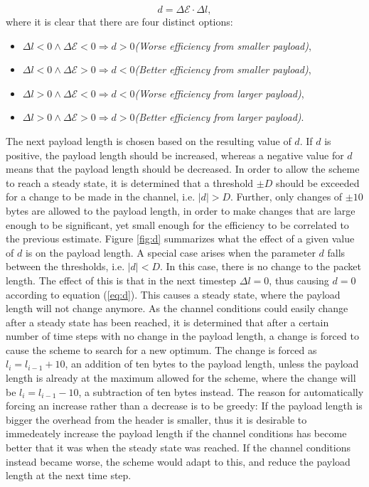 \begin{equation}
d = \Delta \mathcal{E}\cdot\Delta l,\label{eq:d}
\end{equation}
where it is clear that there are four distinct options:
\begin{itemize}  
\setlength{\itemsep}{1pt}
\setlength{\parskip}{0pt}
\setlength{\parsep}{0pt}
\item[ ] $\Delta l < 0 \wedge \Delta \mathcal{E} < 0 \Rightarrow d > 0$\quad \textit{(Worse efficiency from smaller payload)},
\item[ ] $\Delta l < 0 \wedge \Delta \mathcal{E} > 0 \Rightarrow d < 0$\quad \textit{(Better efficiency from smaller payload)},
\item[ ] $\Delta l > 0 \wedge \Delta \mathcal{E} < 0 \Rightarrow d < 0$\quad \textit{(Worse efficiency from larger payload)},
\item[ ] $\Delta l > 0 \wedge \Delta \mathcal{E} > 0 \Rightarrow d > 0$\quad \textit{(Better efficiency from larger payload)}.
\end{itemize}
The next payload length is chosen based on the resulting value of $d$. If $d$ is positive, the payload length should be increased, whereas a negative value for $d$ means that the payload length should be decreased. In order to allow the scheme to reach a steady state, it is determined that a threshold $\pm D$ should be exceeded for a change to be made in the channel, i.e. $|d| > D$. Further, only changes of $\pm 10$ bytes are allowed to the payload length, in order to make changes that are large enough to be significant, yet small enough for the efficiency to be correlated to the previous estimate. Figure \ref{fig:d} summarizes what the effect of a given value of $d$ is on the payload length. 
A special case arises when the parameter $d$ falls between the thresholds, i.e. $|d| < D$. In this case, there is no change to the packet length. The effect of this is that in the next timestep $\Delta l= 0$, thus causing $d = 0$ according to equation (\ref{eq:d}). This causes a steady state, where the payload length will not change anymore. As the channel conditions could easily change after a steady state has been reached, it is determined that after a certain number of time steps with no change in the payload length, a change is forced to cause the scheme to search for a new optimum.
The change is forced as $l_i = l_{i-1} + 10$, an addition of ten bytes to the payload length, unless the payload length is already at the maximum allowed for the scheme, where the change will be $l_i = l_{i-1} -10$, a subtraction of ten bytes instead. The reason for automatically forcing an increase rather than a decrease is to be greedy: If the payload length is bigger the overhead from the header is smaller, thus it is desirable to immedeately increase the payload length if the channel conditions has become better that it was when the steady state was reached. If the channel conditions instead became worse, the scheme would adapt to this, and reduce the payload length at the next time step. 
